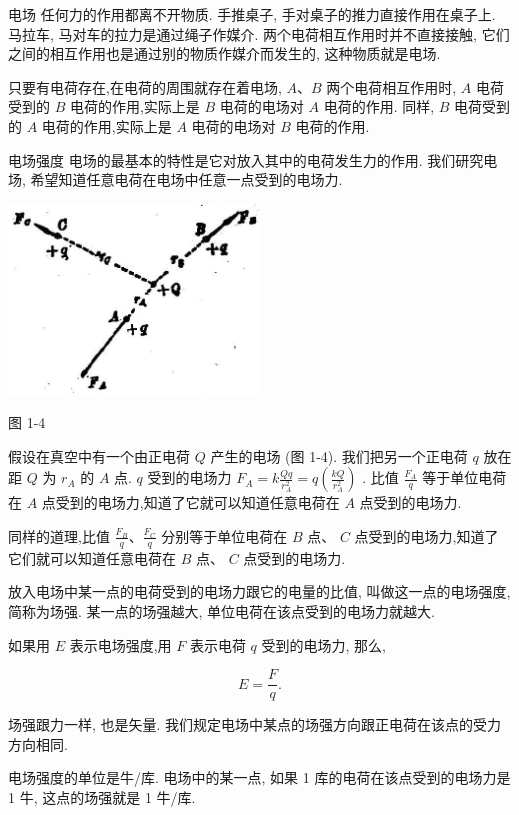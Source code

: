 \documentclass[10pt]{article}
\begin{document}
电场 任何力的作用都离不开物质. 手推桌子, 手对桌子的推力直接作用在桌子上. 马拉车, 马对车的拉力是通过绳子作媒介. 两个电荷相互作用时并不直接接触, 它们之间的相互作用也是通过别的物质作媒介而发生的, 这种物质就是电场.

只要有电荷存在,在电荷的周围就存在着电场, \(A\text{、}B\) 两个电荷相互作用时, \(A\) 电荷受到的 \(B\) 电荷的作用,实际上是 \(B\) 电荷的电场对 \(A\) 电荷的作用. 同样, \(B\) 电荷受到的 \(A\) 电荷的作用,实际上是 \(A\) 电荷的电场对 \(B\) 电荷的作用.

电场强度 电场的最基本的特性是它对放入其中的电荷发生力的作用. 我们研究电场, 希望知道任意电荷在电场中任意一点受到的电场力.

\begin{center}
\includegraphics[max width=0.5\textwidth]{images/01913056-1f15-74d8-9184-9aab52c9d66b_19_780794.jpg}
\end{center}

图 1-4

假设在真空中有一个由正电荷 \(Q\) 产生的电场 (图 1-4). 我们把另一个正电荷 \(q\) 放在距 \(Q\) 为 \({r}_{A}\) 的 \(A\) 点. \(q\) 受到的电场力 \({F}_{A} = k\frac{Qq}{{r}_{A}^{2}} = q\left( \frac{kQ}{{r}_{A}^{2}}\right)\) . 比值 \(\frac{{F}_{A}}{q}\) 等于单位电荷在 \(A\) 点受到的电场力,知道了它就可以知道任意电荷在 \(A\) 点受到的电场力.

同样的道理,比值 \(\frac{{F}_{B}}{q}\text{、}\frac{{F}_{C}}{q}\) 分别等于单位电荷在 \(B\) 点、 \(C\) 点受到的电场力,知道了它们就可以知道任意电荷在 \(B\) 点、 \(C\) 点受到的电场力.

放入电场中某一点的电荷受到的电场力跟它的电量的比值, 叫做这一点的电场强度, 简称为场强. 某一点的场强越大, 单位电荷在该点受到的电场力就越大.

如果用 \(E\) 表示电场强度,用 \(F\) 表示电荷 \(q\) 受到的电场力, 那么,

\[
E = \frac{F}{q}. \tag{1}
\]

场强跟力一样, 也是矢量. 我们规定电场中某点的场强方向跟正电荷在该点的受力方向相同.

电场强度的单位是牛/库. 电场中的某一点, 如果 1 库的电荷在该点受到的电场力是 1 牛, 这点的场强就是 1 牛/库.
\end{document}
